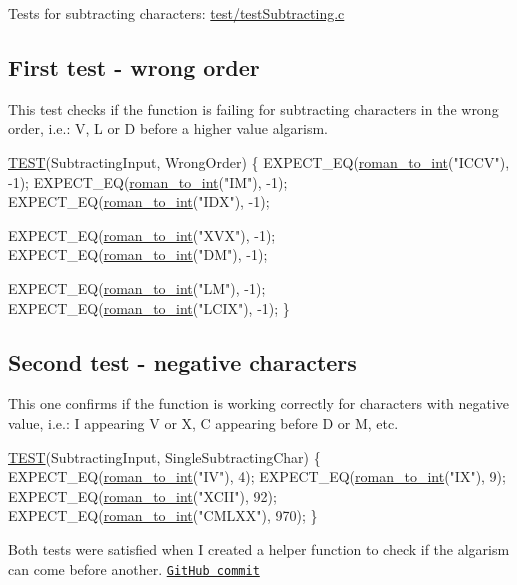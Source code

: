 Tests for subtracting characters\+: \hyperlink{test_subtracting_8c}{test/test\+Subtracting.\+c}

\subsection*{First test -\/ wrong order }

This test checks if the function is failing for subtracting characters in the wrong order, i.\+e.\+: V, L or D before a higher value algarism.


\begin{DoxyCodeInclude}
\hyperlink{test_simple_8c_aff9fa977573ddab7597e233f1775d7c5}{TEST}(SubtractingInput, WrongOrder) \{
    EXPECT\_EQ(\hyperlink{roman_8c_a5d15ad3ed29e4dc0fed9b718523c48c8}{roman\_to\_int}(\textcolor{stringliteral}{"ICCV"}), -1);
    EXPECT\_EQ(\hyperlink{roman_8c_a5d15ad3ed29e4dc0fed9b718523c48c8}{roman\_to\_int}(\textcolor{stringliteral}{"IM"}), -1);
    EXPECT\_EQ(\hyperlink{roman_8c_a5d15ad3ed29e4dc0fed9b718523c48c8}{roman\_to\_int}(\textcolor{stringliteral}{"IDX"}), -1);
    
    EXPECT\_EQ(\hyperlink{roman_8c_a5d15ad3ed29e4dc0fed9b718523c48c8}{roman\_to\_int}(\textcolor{stringliteral}{"XVX"}), -1);
    EXPECT\_EQ(\hyperlink{roman_8c_a5d15ad3ed29e4dc0fed9b718523c48c8}{roman\_to\_int}(\textcolor{stringliteral}{"DM"}), -1);
    
    EXPECT\_EQ(\hyperlink{roman_8c_a5d15ad3ed29e4dc0fed9b718523c48c8}{roman\_to\_int}(\textcolor{stringliteral}{"LM"}), -1);
    EXPECT\_EQ(\hyperlink{roman_8c_a5d15ad3ed29e4dc0fed9b718523c48c8}{roman\_to\_int}(\textcolor{stringliteral}{"LCIX"}), -1);
\}
\end{DoxyCodeInclude}
 \subsection*{Second test -\/ negative characters }

This one confirms if the function is working correctly for characters with negative value, i.\+e.\+: I appearing V or X, C appearing before D or M, etc.


\begin{DoxyCodeInclude}
\hyperlink{test_simple_8c_aff9fa977573ddab7597e233f1775d7c5}{TEST}(SubtractingInput, SingleSubtractingChar) \{
    EXPECT\_EQ(\hyperlink{roman_8c_a5d15ad3ed29e4dc0fed9b718523c48c8}{roman\_to\_int}(\textcolor{stringliteral}{"IV"}), 4);
    EXPECT\_EQ(\hyperlink{roman_8c_a5d15ad3ed29e4dc0fed9b718523c48c8}{roman\_to\_int}(\textcolor{stringliteral}{"IX"}), 9);
    EXPECT\_EQ(\hyperlink{roman_8c_a5d15ad3ed29e4dc0fed9b718523c48c8}{roman\_to\_int}(\textcolor{stringliteral}{"XCII"}), 92);
    EXPECT\_EQ(\hyperlink{roman_8c_a5d15ad3ed29e4dc0fed9b718523c48c8}{roman\_to\_int}(\textcolor{stringliteral}{"CMLXX"}), 970);
\}
\end{DoxyCodeInclude}
 Both tests were satisfied when I created a helper function to check if the algarism can come before another. \href{https://github.com/diogenes1oliveira/libroman/commit/4311b18560b1ccf7ad2c0f3b5fa90c4d505dd7c0#diff-3d6fc1bf772186c45fcd2c22d7ecd7b4}{\tt Git\+Hub commit}

